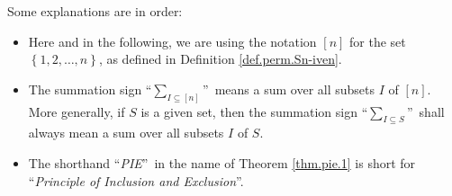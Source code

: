 Some explanations are in order:

\begin{itemize}
\item Here and in the following, we are using the notation $\left[  n\right]
$ for the set $\left\{  1,2,\ldots,n\right\}  $, as defined in Definition
\ref{def.perm.Sn-iven}.

\item The summation sign \textquotedblleft$\sum_{I\subseteq\left[  n\right]
}$\textquotedblright\ means a sum over all subsets $I$ of $\left[  n\right]
$. More generally, if $S$ is a given set, then the summation sign
\textquotedblleft$\sum_{I\subseteq S}$\textquotedblright\ shall always mean a
sum over all subsets $I$ of $S$.

\item The shorthand \textquotedblleft\emph{PIE}\textquotedblright\ in the name
of Theorem \ref{thm.pie.1} is short for \textquotedblleft\emph{Principle of
Inclusion and Exclusion}\textquotedblright.
\end{itemize}


